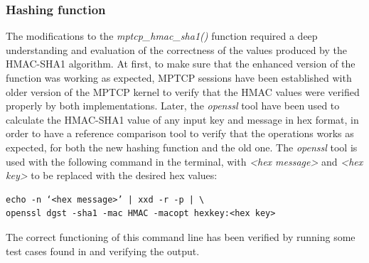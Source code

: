 \subsubsection{Hashing function}
The modifications to the \textit{mptcp\_hmac\_sha1()} function required a deep understanding and evaluation of the correctness of the values produced by the HMAC-SHA1 algorithm. At first, to make sure that the enhanced version of the function was working as expected, MPTCP sessions have been established with older version of the MPTCP kernel to verify that the HMAC values were verified properly by both implementations. Later, the \textit{openssl} tool have been used to calculate the HMAC-SHA1 value of any input key and message in hex format, in order to have a reference comparison tool to verify that the operations works as expected, for both the new hashing function and the old one. The \textit{openssl} tool is used with the following command in the terminal, with \textit{<hex message>} and \textit{<hex key>} to be replaced with the desired hex values:

\begin{verbatim}
echo -n ‘<hex message>’ | xxd -r -p | \
openssl dgst -sha1 -mac HMAC -macopt hexkey:<hex key>
\end{verbatim}
 
The correct functioning of this command line has been verified by running some test cases found in  and verifying the output.

